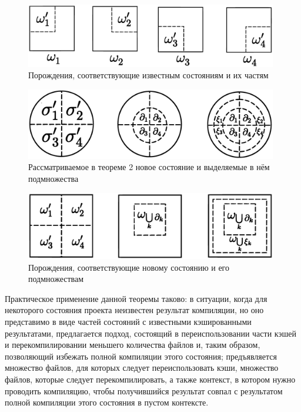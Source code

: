 \begin{figure}[h!]
	\centering
	\includegraphics[width=11cm]{theorem2_dst.eps}
	\caption{Порождения, соответствующие известным состояниям и их частям}
	\label{fig:theorem2_dst}
\end{figure}

\begin{figure}[h!]
	\centering
	\includegraphics[width=11cm]{theorem2_srcn.eps}
	\caption{Рассматриваемое в теореме 2 новое состояние и выделяемые в нём подмножества}
	\label{fig:theorem2_srcn}
\end{figure}

\begin{figure}[h!]
	\centering
	\includegraphics[width=11cm]{theorem2_dstn.eps}
	\caption{Порождения, соответствующие новому состоянию и его подмножествам}
	\label{fig:theorem2_dstn}
\end{figure}

Практическое применение данной теоремы таково: в ситуации, когда для некоторого состояния проекта неизвестен результат компиляции, но оно представимо в виде частей состояний с известными кэшированными результатами, предлагается подход, состоящий в переиспользовании части кэшей и перекомпилировании меньшего количества файлов и, таким образом, позволяющий избежать полной компиляции этого состояния; предъявляется множество файлов, для которых следует переиспользовать кэши, множество файлов, которые следует перекомпилировать, а также контекст, в котором нужно проводить компиляцию, чтобы получившийся результат совпал с результатом полной компиляции этого состояния в пустом контексте.


